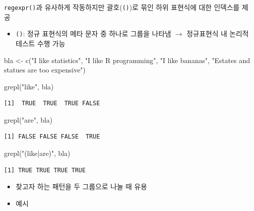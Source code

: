 \documentclass[
  11pt,
]{krantz}
\newenvironment{Shaded}{\begin{snugshade}}{\end{snugshade}}
\newcommand{\FunctionTok}[1]{\textcolor[rgb]{0,0,0}{#1}}
\newcommand{\NormalTok}[1]{#1}
\newcommand{\OtherTok}[1]{\textcolor[rgb]{0.37,0.37,0.37}{#1}}
\newcommand{\StringTok}[1]{\textcolor[rgb]{0.5,0.5,0.5}{#1}}
\providecommand{\tightlist}{%
  \setlength{\itemsep}{0pt}\setlength{\parskip}{0pt}}
\begin{document}
\texttt{regexpr()}과 유사하게 작동하지만 괄호(\texttt{()})로 묶인 하위 표현식에 대한 인덱스를 제공

\begin{itemize}
\tightlist
\item
  \texttt{()}: 정규 표현식의 메타 문자 중 하나로 그룹을 나타냄 \(\rightarrow\) 정규표현식 내 논리적 테스트 수행 가능
\end{itemize}

\footnotesize

\begin{Shaded}
\begin{Highlighting}[]
\NormalTok{bla }\OtherTok{\textless{}{-}} \FunctionTok{c}\NormalTok{(}\StringTok{"I like statistics"}\NormalTok{, }
         \StringTok{"I like R programming"}\NormalTok{, }
         \StringTok{"I like bananas"}\NormalTok{, }
         \StringTok{"Estates and statues are too expensive"}\NormalTok{)}

\FunctionTok{grepl}\NormalTok{(}\StringTok{"like"}\NormalTok{, bla)}
\end{Highlighting}
\end{Shaded}

\begin{verbatim}
[1]  TRUE  TRUE  TRUE FALSE
\end{verbatim}

\begin{Shaded}
\begin{Highlighting}[]
\FunctionTok{grepl}\NormalTok{(}\StringTok{"are"}\NormalTok{, bla)}
\end{Highlighting}
\end{Shaded}

\begin{verbatim}
[1] FALSE FALSE FALSE  TRUE
\end{verbatim}

\begin{Shaded}
\begin{Highlighting}[]
\FunctionTok{grepl}\NormalTok{(}\StringTok{"(like|are)"}\NormalTok{, bla)}
\end{Highlighting}
\end{Shaded}

\begin{verbatim}
[1] TRUE TRUE TRUE TRUE
\end{verbatim}

\normalsize

\begin{itemize}
\tightlist
\item
  찾고자 하는 패턴을 두 그룹으로 나눌 때 유용
\item
  예시
\end{itemize}
\end{document}
